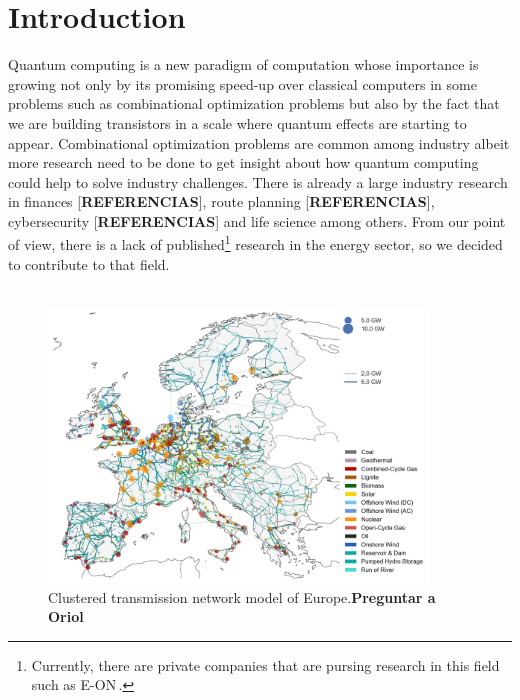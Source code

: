 
\chapter{Introduction} %

\label{Chapter1} %

%
%
Quantum computing is a new paradigm of computation whose importance is growing not only by its promising speed-up over classical computers in some problems such as combinational optimization problems but also by the fact that we are building transistors in a scale where quantum effects are starting to appear. Combinational optimization problems are common among industry albeit more research need to be done to get insight about how quantum computing could help to solve industry challenges. There is already a large industry research in finances [\textbf{REFERENCIAS}], route planning [\textbf{REFERENCIAS}], cybersecurity [\textbf{REFERENCIAS}] and life science among others. From our point of view, there is a lack of published\footnote{Currently, there are private companies that are pursing research in this field such as E-ON\,\cite{Fernandez-Campoamor2021CommunityAnnealing}.} research in the energy sector, so we decided to contribute to that field.\\\\
\begin{figure}[H]
  \begin{center}
\includegraphics[width=0.9\textwidth]{Figures/Europe-Grid.png}
  \end{center}
  \caption{Clustered transmission network model of Europe.\textbf{Preguntar a Oriol}}
\end{figure}

